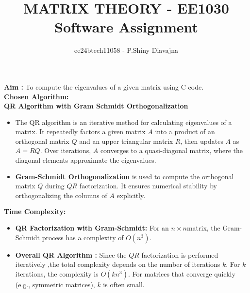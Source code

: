 \documentclass[journal,12pt,onecolumn]{IEEEtran}
\theoremstyle{remark}
\begin{document}
\title{{MATRIX THEORY - EE1030}\\
Software Assignment}

\author{ee24btech11058 - P.Shiny Diavajna}
\maketitle
\renewcommand{\thefigure}{\theenumi}
\renewcommand{\thetable}{\theenumi}

 \textbf{Aim :} To compute the eigenvalues of a given matrix using C code.\\
 
\textbf{Chosen Algorithm:}\\

\textbf{QR Algorithm with Gram Schmidt Orthogonalization }
    \begin{itemize}
    \item   The QR algorithm is an iterative method for calculating eigenvalues of a matrix. It repeatedly factors a given matrix $A$ into a product of an orthogonal matrix $Q$ and an upper triangular matrix $R$, then updates $A$ as $A=RQ$. Over iterations, $A$ converges to a quasi-diagonal matrix, where the diagonal elements approximate the eigenvalues.

    \item \textbf{Gram-Schmidt Orthogonalization} is used to compute the orthogonal matrix $Q$ during $QR$ factorization. It ensures numerical stability by orthogonalizing the columns of $A$ explicitly.\\
     \end{itemize}

\textbf{Time Complexity:}

\begin{itemize}
    \item  \textbf{QR Factorization with Gram-Schmidt:} For an $n\times n$matrix, the Gram-Schmidt process has a complexity of $O(n^3)$.
    \item  \textbf{Overall QR Algorithm :} Since the $QR$ factorization is performed iteratively ,the total complexity depends on the number of iterations $k$. For $k$ iterations, the complexity is  $O(kn^3).$
    For matrices that converge quickly (e.g., symmetric matrices), $k$ is often small.\\
\end{itemize}
\end{document}
